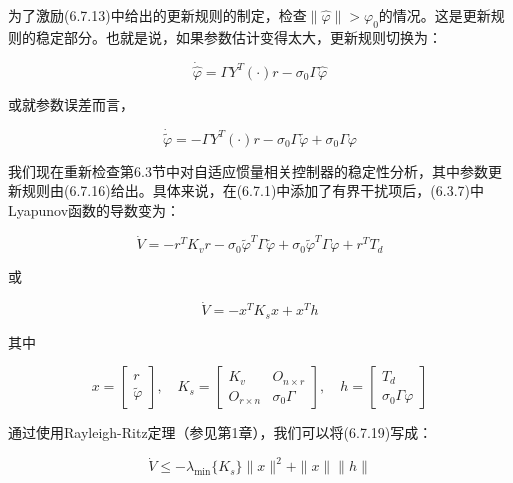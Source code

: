 \documentclass[12pt,a4paper]{ctexart}
\begin{document}
为了激励(6.7.13)中给出的更新规则的制定，检查$\|\hat{\varphi}\| > \varphi_0$的情况。这是更新规则的稳定部分。也就是说，如果参数估计变得太大，更新规则切换为：

\begin{equation}\label{eq:sigma-large}
\dot{\hat{\varphi}} = \Gamma Y^T(\cdot)r - \sigma_0 \Gamma \hat{\varphi}
\end{equation}

或就参数误差而言，

\begin{equation}\label{eq:param-error-large}
\dot{\tilde{\varphi}} = -\Gamma Y^T(\cdot)r - \sigma_0 \Gamma \tilde{\varphi} + \sigma_0 \Gamma \varphi
\end{equation}

我们现在重新检查第6.3节中对自适应惯量相关控制器的稳定性分析，其中参数更新规则由(6.7.16)给出。具体来说，在(6.7.1)中添加了有界干扰项后，(6.3.7)中Lyapunov函数的导数变为：

\begin{equation}\label{eq:lyapunov-sigma}
\dot{V} = -r^T K_v r - \sigma_0 \tilde{\varphi}^T \Gamma \tilde{\varphi} + \sigma_0 \tilde{\varphi}^T \Gamma \varphi + r^T T_d
\end{equation}

或

\begin{equation}\label{eq:lyapunov-sigma2}
\dot{V} = -x^T K_s x + x^T h
\end{equation}

其中

\begin{equation}
x = \begin{bmatrix} r \\ \tilde{\varphi} \end{bmatrix}, \quad K_s = \begin{bmatrix} K_v & O_{n \times r} \\ O_{r \times n} & \sigma_0 \Gamma \end{bmatrix}, \quad h = \begin{bmatrix} T_d \\ \sigma_0 \Gamma \varphi \end{bmatrix}
\end{equation}

通过使用Rayleigh-Ritz定理（参见第1章），我们可以将(6.7.19)写成：

\begin{equation}\label{eq:rayleigh-sigma}
\dot{V} \leq -\lambda_{\min}\{K_s\}\|x\|^2 + \|x\|\|h\|
\end{equation}
\end{document}
